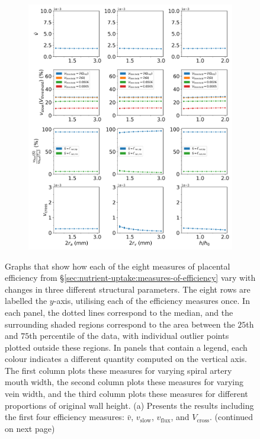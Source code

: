             \begin{figure}
                \vspace{-1.5cm}
                \centering
                \begin{subfigure}{\textwidth}
                    \includegraphics[width=\textwidth]{diagrams/results-variations/mega1_artery_width_vein_width_wall_height_ratio.png}
                    \caption{}
                    \label{fig:mega-other1:1}
                \end{subfigure}
                \caption{Graphs that show how each of the eight measures of placental efficiency from \S\ref{sec:nutrient-uptake:measures-of-efficiency} vary with changes in three different structural parameters. The eight rows are labelled the $y$-axis, utilising each of the efficiency measures once. In each panel, the dotted lines correspond to the median, and the surrounding shaded regions correspond to the area between the $25$th and $75$th percentile of the data, with individual outlier points plotted outside these regions. In panels that contain a legend, each colour indicates a different quantity computed on the vertical axis. The first column plots these measures for varying spiral artery mouth width, the second column plots these measures for varying vein width, and the third column plots these measures for different proportions of original wall height. (a) Presents the results including the first four efficiency measures: $\bar{v}$, $v_\text{slow}$, $v_\text{flux}$, and $V_\text{cross}$. (continued on next page)}
            \end{figure}
